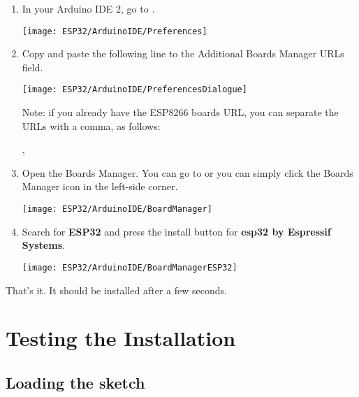 \begin{enumerate}
  \item In your Arduino IDE 2, go to .
    
    \texttt{[image: ESP32/ArduinoIDE/Preferences]}
    
  \item Copy and paste the following line to the Additional Boards Manager URLs field.
  
        \medskip
  
  
        \texttt{[image: ESP32/ArduinoIDE/PreferencesDialogue]}
  
        \medskip
          
        Note: if you already have the ESP8266 boards URL, you can separate the URLs with a comma, as follows:
  
        \medskip
       
       , 
       
  \item Open the Boards Manager. You can go to  or you can simply click the Boards Manager icon in the left-side corner.       
  
        \texttt{[image: ESP32/ArduinoIDE/BoardManager]}
        
  \item Search for \textbf{ESP32} and press the install button for \textbf{esp32 by Espressif Systems}.        
  
        \texttt{[image: ESP32/ArduinoIDE/BoardManagerESP32]}
  
\end{enumerate}

\medskip

That's it. It should be installed after a few seconds.

\section{Testing the Installation}

\subsection{Loading the sketch }

